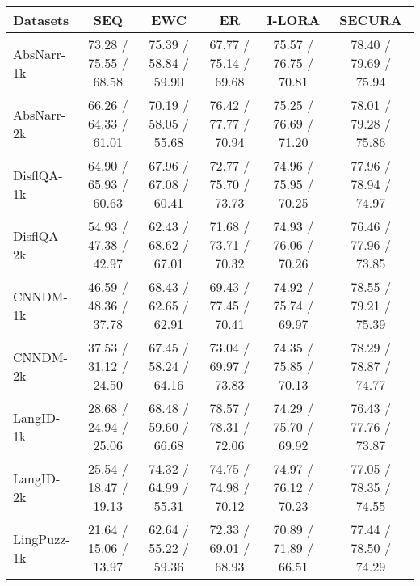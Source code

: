 \begin{table*}[h]
\centering
\small
\begin{tabular}{lccccc}
\toprule
\textbf{Datasets} & \textbf{SEQ} & \textbf{EWC}& \textbf{ER} & \textbf{I-LORA} & \textbf{SECURA} \\
\midrule
AbsNarr-1k
& 73.28 / 75.55 / 68.58
& 75.39 / 58.84 / 59.90
& 67.77 / 75.14 / 69.68
& 75.57 / 76.75 / 70.81
& 78.40 / 79.69 / 75.94
\\

AbsNarr-2k
& 
66.26 / 64.33 / 61.01
& 70.19 / 58.05 / 55.68
& 76.42 / 77.77 / 70.94
& 
75.25 / 76.69 / 71.20
& 





78.01 / 79.28 / 75.86
\\
DisflQA-1k
& 
64.90 / 65.93 / 60.63
& 67.96 / 67.08 / 60.41
& 72.77 / 75.70 / 73.73
& 74.96 / 75.95 / 70.25
& 
77.96 / 78.94 / 74.97
\\

DisflQA-2k
& 
54.93 / 47.38 / 42.97
& 62.43 / 68.62 / 67.01
& 71.68 / 73.71 / 70.32
& 
74.93 / 76.06 / 70.26
& 






76.46 / 77.96 / 73.85
\\
CNNDM-1k
& 46.59 / 48.36 / 37.78
& 68.43 / 62.65 / 62.91
& 69.43 / 77.45 / 70.41
& 74.92 / 75.74 / 69.97
& 78.55 / 79.21 / 75.39
\\

CNNDM-2k
& 
37.53 / 31.12 / 24.50
& 67.45 / 58.24 / 64.16
& 73.04 / 69.97 / 73.83
& 
74.35 / 75.85 / 70.13
& 





78.29 / 78.87 / 74.77
\\

LangID-1k
& 
28.68 / 24.94 / 25.06
& 68.48 / 59.60 / 66.68
& 78.57 / 78.31 / 72.06
& 74.29 / 75.70 / 69.92
& 
76.43 / 77.76 / 73.87
\\

LangID-2k
& 
25.54 / 18.47 / 19.13
& 74.32 / 64.99 / 55.31
& 74.75 / 74.98 / 70.12
& 
74.97 / 76.12 / 70.23
& 






77.05 / 78.35 / 74.55
\\
LingPuzz-1k
& 21.64 / 15.06 / 13.97
& 62.64 / 55.22 / 59.36
& 72.33 / 69.01 / 68.93
& 70.89 / 71.89 / 66.51
& 77.44 / 78.50 / 74.29
\\


\end{tabular}
\end{table*}
